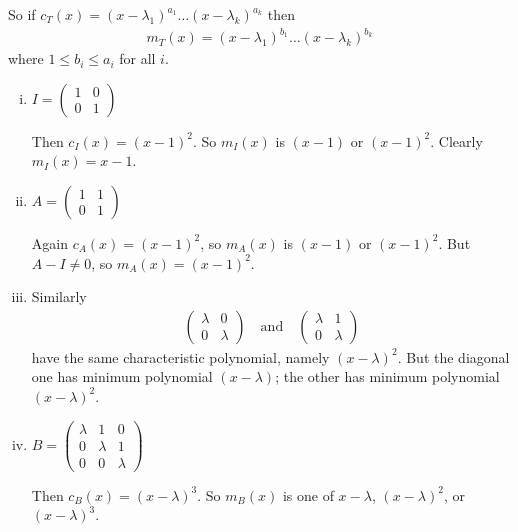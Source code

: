 \documentclass{article}
\theoremstyle{definition} \newtheorem*{definition}{Definition}
\newcommand{\mt}{m_T}
\begin{document}
So if $c_T(x)=(x-\lambda_1)^{a_1}\dots(x-\lambda_k)^{a_k}$ then
\begin{align*}
  \mt(x) = (x-\lambda_1)^{b_1}\dots(x-\lambda_k)^{b_k}
\end{align*}
where $1 \le b_i \le a_i$ for all $i$.\\

\begin{exmps}
\begin{enumerate}[(i)]\hfill
    \item $I = \left( 
      \begin{matrix}
        1 & 0 \\
        0 & 1
      \end{matrix}
      \right)$

      Then  $c_I(x)=(x-1)^2$. So $m_I(x)$ is $(x-1)$ or $(x-1)^2$.
      Clearly $m_I(x)=x-1$.
    \item
      $A=\left( 
\begin{matrix}
  1 & 1\\
  0 & 1
\end{matrix}
      \right)$

      Again $c_A(x)=(x-1)^2$, so $m_A(x)$ is $(x-1)$ or $(x-1)^2$.
      But $A-I \neq 0$, so $m_A(x)=(x-1)^2$.
    \item Similarly
      \begin{align*}
        \left( 
        \begin{matrix}
          \lambda & 0\\
          0 & \lambda
        \end{matrix}
        \right)\quad \text{and} \quad \left( 
        \begin{matrix}
          \lambda & 1 \\
          0 & \lambda
        \end{matrix}
        \right)
      \end{align*}
      have the same characteristic polynomial, namely $(x-\lambda)^2$.
      But the diagonal one has minimum polynomial $(x-\lambda)$;
      the other has minimum polynomial $(x-\lambda)^2$.

    \item $B = \left( 
\begin{matrix}
  \lambda & 1 & 0\\
  0  & \lambda & 1 \\
  0 & 0 & \lambda
\end{matrix}
      \right)$

      Then $c_B(x)=(x-\lambda)^3$. So $m_B(x)$ is one of $x-\lambda$, 
      $(x-\lambda)^2$, or $(x-\lambda)^3$.


\end{enumerate}
\end{exmps}
\end{document}
